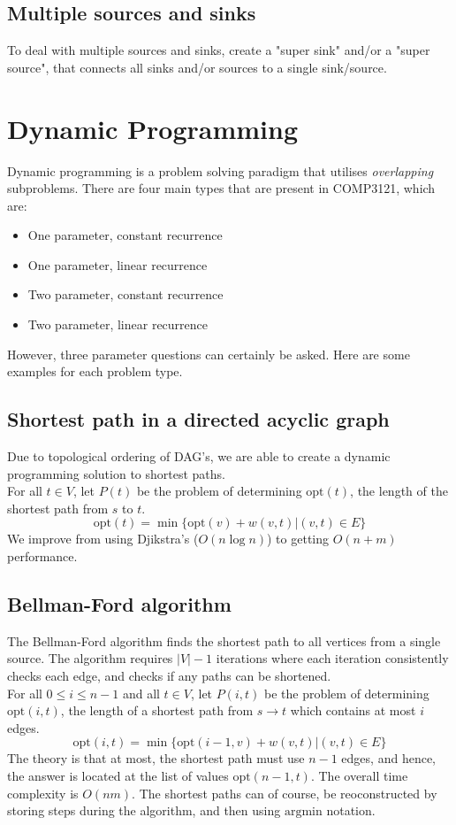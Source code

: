 \documentclass[journal, letterpaper]{IEEEtran}
\begin{document}
  \subsection{Multiple sources and sinks}
  To deal with multiple sources and sinks, create a "super sink" and/or a "super source", that connects all
  sinks and/or sources to a single sink/source.
  \newpage
  \section{Dynamic Programming}
  Dynamic programming is a problem solving paradigm that utilises \emph{overlapping} subproblems. There are four main
  types that are present in COMP3121, which are:
  \begin{itemize}
    \item One parameter, constant recurrence 
    \item One parameter, linear recurrence
    \item Two parameter, constant recurrence
    \item Two parameter, linear recurrence
  \end{itemize}
  However, three parameter questions can certainly be asked. Here are some examples for each problem type. 
  
  \subsection{Shortest path in a  directed acyclic graph} 
  Due to topological ordering of DAG's, we are able to create a dynamic programming solution to shortest paths. 
  \\ For all $t \in V$, let $P(t)$ be the problem of determining $\text{opt}(t)$, the length of the shortest
  path from $s$ to $t$. 
  \[ \text{opt}(t) = \min\{\text{opt}(v) + w(v, t) | (v, t) \in E \}\]
  We improve from using Djikstra's ($O(n\log n)$) to getting $O(n + m)$ performance.
  \subsection{Bellman-Ford algorithm} 
  The Bellman-Ford algorithm finds the shortest path to all vertices from a single source. The algorithm requires $|V| - 1$ iterations
  where each iteration consistently checks each edge, and checks if any paths can be shortened. \\
  For all $0 \le i \le n - 1$ and all
  $t \in V$, let $P(i, t)$ be the problem of determining $\text{opt}(i, t)$, the length of a shortest path from $s \to t$
  which contains at most $i$ edges. 
  \[ \text{opt}(i, t) = \min\{ \text{opt}(i - 1, v) + w(v, t) | (v, t) \in E\}\]
  The theory is that at most, the shortest path must use $n - 1$ edges, and hence, the answer is located at the 
  list of values $\text{opt}(n - 1, t)$. The overall time complexity is $O(nm)$. The shortest paths can of course,
  be reoconstructed by storing steps during the algorithm, and then using $\text{argmin}$ notation.
\end{document}
